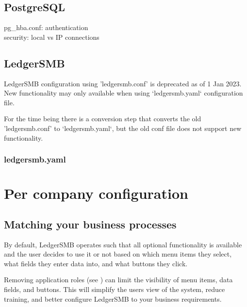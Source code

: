 \section{PostgreSQL}
\label{sec-global-config-postgresql}

pg\_hba.conf: authentication \\
security: local vs IP connections \\




\section{LedgerSMB}
\label{sec-global-config-ledgersmb}

LedgerSMB configuration using 'ledgersmb.conf' is deprecated as of 1 Jan 2023. New functionality may only available when using `ledgersmb.yaml` configuration file.

For the time being there is a conversion step that converts the old 'ledgersmb.conf' to `ledgersmb.yaml`, but the old conf file does not support new functionality.

\subsection{ledgersmb.yaml}
\label{subsec-global-config-ledgersmb-yaml}



\chapter{Per company configuration}
\label{cha-company-config}

\section{Matching your business processes}
\label{sec-company-config-matching-your-business}

By default, LedgerSMB operates such that all optional functionality is available and the user decides to use it or not based on which menu items they select, what fields they enter data into, and what buttons they click.

Removing application roles  (see ) can limit the visibility of  menu items, data fields, and buttons. This will simplify the users view of the system, reduce training, and better configure LedgerSMB to your business requirements.

